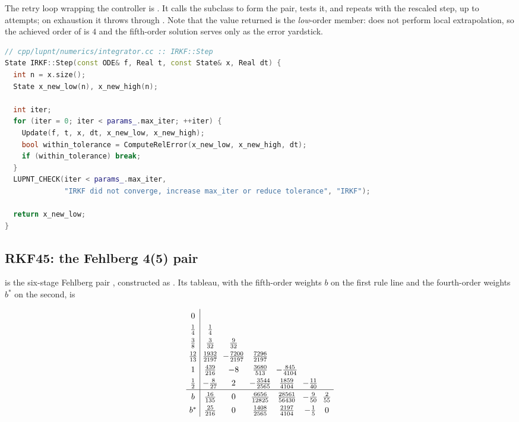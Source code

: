 The retry loop wrapping the controller is . It calls the
subclass  to form the pair, tests it, and repeats with the
rescaled step, up to  attempts; on exhaustion it throws
through . Note that the value returned is the
\emph{low}-order member: \lupnt{} does not perform local extrapolation, so the
achieved order of  is $4$ and the fifth-order solution serves only
as the error yardstick.

\begin{lstlisting}[language=cpp, caption={Adaptive retry loop. Source: \code{cpp/lupnt/numerics/integrator.cc}}, label={lst:int-irkf-step}]
// cpp/lupnt/numerics/integrator.cc :: IRKF::Step
State IRKF::Step(const ODE& f, Real t, const State& x, Real dt) {
  int n = x.size();
  State x_new_low(n), x_new_high(n);

  int iter;
  for (iter = 0; iter < params_.max_iter; ++iter) {
    Update(f, t, x, dt, x_new_low, x_new_high);
    bool within_tolerance = ComputeRelError(x_new_low, x_new_high, dt);
    if (within_tolerance) break;
  }
  LUPNT_CHECK(iter < params_.max_iter,
              "IRKF did not converge, increase max_iter or reduce tolerance", "IRKF");

  return x_new_low;
}
\end{lstlisting}

\subsection{RKF45: the Fehlberg 4(5) pair}
\label{sec:int-rkf45}

 is the six-stage Fehlberg pair \citep{fehlberg1969}, constructed
as . Its tableau, with the fifth-order weights $b$ on the first
rule line and the fourth-order weights $b^{*}$ on the second, is

\begin{equation}
  \label{eq:int-rkf45-tableau}
  {\setlength{\arraycolsep}{3pt}
  \renewcommand{\arraystretch}{1.35}
  \begin{array}{c|cccccc}
    0 & & & & & & \\
    \tfrac{1}{4}    & \tfrac{1}{4} & & & & & \\
    \tfrac{3}{8}    & \tfrac{3}{32} & \tfrac{9}{32} & & & & \\
    \tfrac{12}{13}  & \tfrac{1932}{2197} & -\tfrac{7200}{2197}
                    & \tfrac{7296}{2197} & & & \\
    1               & \tfrac{439}{216} & -8 & \tfrac{3680}{513}
                    & -\tfrac{845}{4104} & & \\
    \tfrac{1}{2}    & -\tfrac{8}{27} & 2 & -\tfrac{3544}{2565}
                    & \tfrac{1859}{4104} & -\tfrac{11}{40} & \\
    \hline
    b               & \tfrac{16}{135} & 0 & \tfrac{6656}{12825}
                    & \tfrac{28561}{56430} & -\tfrac{9}{50} & \tfrac{2}{55} \\
    b^{*}           & \tfrac{25}{216} & 0 & \tfrac{1408}{2565}
                    & \tfrac{2197}{4104} & -\tfrac{1}{5} & 0
  \end{array}}
\end{equation}

